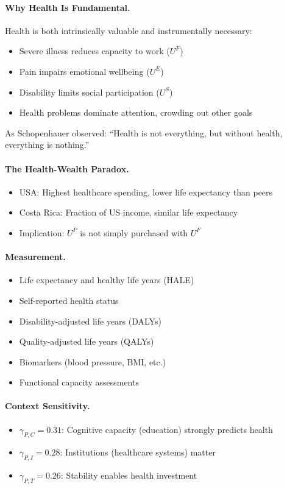 \paragraph{Why Health Is Fundamental.}
Health is both intrinsically valuable and instrumentally necessary:
\begin{itemize}
\item Severe illness reduces capacity to work ($U^F$)
\item Pain impairs emotional wellbeing ($U^E$)
\item Disability limits social participation ($U^S$)
\item Health problems dominate attention, crowding out other goals
\end{itemize}

As Schopenhauer observed: ``Health is not everything, but without health, 
everything is nothing.''

\paragraph{The Health-Wealth Paradox.}
\begin{itemize}
\item USA: Highest healthcare spending, lower life expectancy than peers
\item Costa Rica: Fraction of US income, similar life expectancy
\item Implication: $U^P$ is not simply purchased with $U^F$
\end{itemize}

\paragraph{Measurement.}
\begin{itemize}
\item Life expectancy and healthy life years (HALE)
\item Self-reported health status
\item Disability-adjusted life years (DALYs)
\item Quality-adjusted life years (QALYs)
\item Biomarkers (blood pressure, BMI, etc.)
\item Functional capacity assessments
\end{itemize}

\paragraph{Context Sensitivity.}
\begin{itemize}
\item $\gamma_{P,C} = 0.31$: Cognitive capacity (education) strongly predicts health
\item $\gamma_{P,I} = 0.28$: Institutions (healthcare systems) matter
\item $\gamma_{P,T} = 0.26$: Stability enables health investment
\end{itemize}

